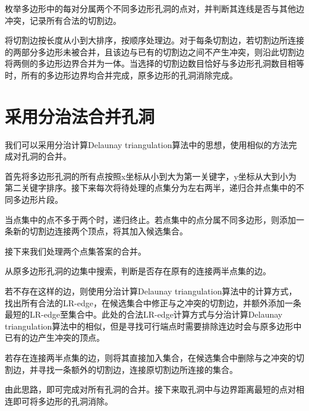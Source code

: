 枚举多边形中的每对分属两个不同多边形孔洞的点对，并判断其连线是否与其他边冲突，记录所有合法的切割边。

将切割边按长度从小到大排序，按顺序处理边。对于每条切割边，若切割边所连接的两部分多边形未被合并，且该边与已有的切割边之间不产生冲突，则沿此切割边将两侧的多边形边界合并为一体。当选择的切割边数目恰好与多边形孔洞数目相等时，所有的多边形边界均合并完成，原多边形的孔洞消除完成。

\section{采用分治法合并孔洞}
我们可以采用分治计算Delaunay triangulation算法中的思想，使用相似的方法完成对孔洞的合并。

首先将多边形孔洞的所有点按照x坐标从小到大为第一关键字，y坐标从大到小为第二关键字排序。接下来每次将待处理的点集分为左右两半，递归合并点集中的不同多边形片段。

当点集中的点不多于两个时，递归终止。若点集中的点分属不同多边形，则添加一条新的切割边连接两个顶点，将其加入候选集合。

接下来我们处理两个点集答案的合并。

从原多边形孔洞的边集中搜索，判断是否存在原有的连接两半点集的边。

若不存在这样的边，则使用分治计算Delaunay triangulation算法中的计算方式，找出所有合法的LR-edge，在候选集合中修正与之冲突的切割边，并额外添加一条最短的LR-edge至集合中。此处的合法LR-edge计算方式与分治计算Delaunay triangulation算法中的相似，但是寻找可行端点时需要排除连边时会与原多边形中已有的边产生冲突的顶点。

若存在连接两半点集的边，则将其直接加入集合，在候选集合中删除与之冲突的切割边，并寻找一条额外的切割边，连接原切割边所连接的集合。

由此思路，即可完成对所有孔洞的合并。接下来取孔洞中与边界距离最短的点对相连即可将多边形的孔洞消除。



